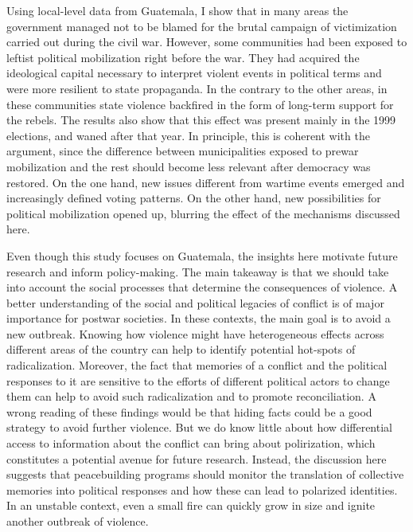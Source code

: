 \documentclass[12pt, notitlepage]{article}
\begin{document}
Using local-level data from Guatemala, I show that in many areas the government managed not to be blamed for the brutal campaign of victimization carried out during the civil war.
However, some communities had been exposed to leftist political mobilization right before the war.
They had acquired the ideological capital necessary to interpret violent events in political terms and were more resilient to state propaganda.
In the contrary to the other areas, in these communities state violence backfired in the form of long-term support for the rebels.
The results also show that this effect was present mainly in the 1999 elections, and waned after that year.
In principle, this is coherent with the argument, since the difference between municipalities exposed to prewar mobilization and the rest should become less relevant after democracy was restored.
On the one hand, new issues different from wartime events emerged and increasingly defined voting patterns.
On the other hand, new possibilities for political mobilization opened up, blurring the effect of the mechanisms discussed here.

Even though this study focuses on Guatemala, the insights here motivate future research and inform policy-making.
The main takeaway is that we should take into account the social processes that determine the consequences of violence.
A better understanding of the social and political legacies of conflict is of major importance for postwar societies.
In these contexts, the main goal is to avoid a new outbreak.
Knowing how violence might have heterogeneous effects across different areas of the country can help to identify potential hot-spots of radicalization.
Moreover, the fact that memories of a conflict and the political responses to it are sensitive to the efforts of different political actors to change them can help to avoid such radicalization and to promote reconciliation.
A wrong reading of these findings would be that hiding facts could be a good strategy to avoid further violence.
But we do know little about how differential access to information about the conflict can bring about polirization, which constitutes a potential avenue for future research.
Instead, the discussion here suggests that peacebuilding programs should monitor the translation of collective memories into political responses and how these can lead to polarized identities.
In an unstable context, even a small fire can quickly grow in size and ignite another outbreak of violence.

\clearpage



% 
\end{document}
